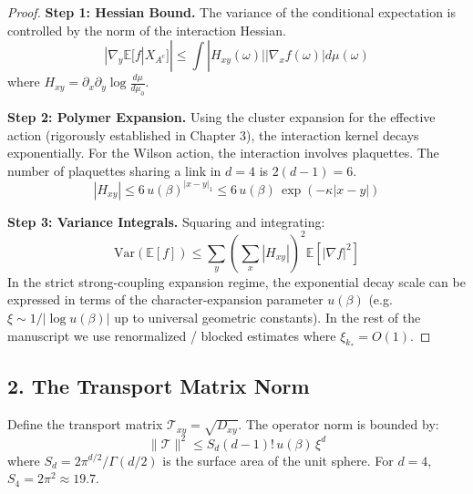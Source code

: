 \begin{proof}
\textbf{Step 1: Hessian Bound.}
The variance of the conditional expectation is controlled by the norm of the interaction Hessian.
\begin{equation}
|\nabla_y \mathbb{E}[f | X_{A^c}]| \leq \int |H_{xy}(\omega)| |\nabla_x f(\omega)| d\mu(\omega)
\end{equation}
where $H_{xy} = \partial_x \partial_y \log \frac{d\mu}{d\mu_0}$.

\textbf{Step 2: Polymer Expansion.}
Using the cluster expansion for the effective action (rigorously established in Chapter 3), the interaction kernel decays exponentially. For the Wilson action, the interaction involves plaquettes. The number of plaquettes sharing a link in $d=4$ is $2(d-1) = 6$.
\begin{equation}
|H_{xy}| \leq 6 \, u(\beta)^{|x-y|_1} \leq 6 \, u(\beta) \, \exp(-\kappa |x-y|)
\end{equation}

\textbf{Step 3: Variance Integrals.}
Squaring and integrating:
\begin{equation}
\text{Var}(\mathbb{E}[f]) \leq \sum_y \left(\sum_x |H_{xy}|\right)^2 \mathbb{E}[|\nabla f|^2]
\end{equation}
In the strict strong-coupling expansion regime, the exponential decay scale can be expressed in terms of the character-expansion parameter $u(\beta)$ (e.g. $\xi \sim 1/|\log u(\beta)|$ up to universal geometric constants). In the rest of the manuscript we use renormalized / blocked estimates where $\xi_{k_*}=O(1)$.
\end{proof}

\subsection{2. The Transport Matrix Norm}

\begin{theorem}
Define the transport matrix $\mathcal{T}_{xy} = \sqrt{D_{xy}}$. The operator norm is bounded by:
\begin{equation}
\| \mathcal{T} \|^2 \leq S_d (d-1)!\, u(\beta)\, \xi^d
\end{equation}
where $S_d = 2\pi^{d/2}/\Gamma(d/2)$ is the surface area of the unit sphere. For $d=4$, $S_4 = 2\pi^2 \approx 19.7$.
\end{theorem}

